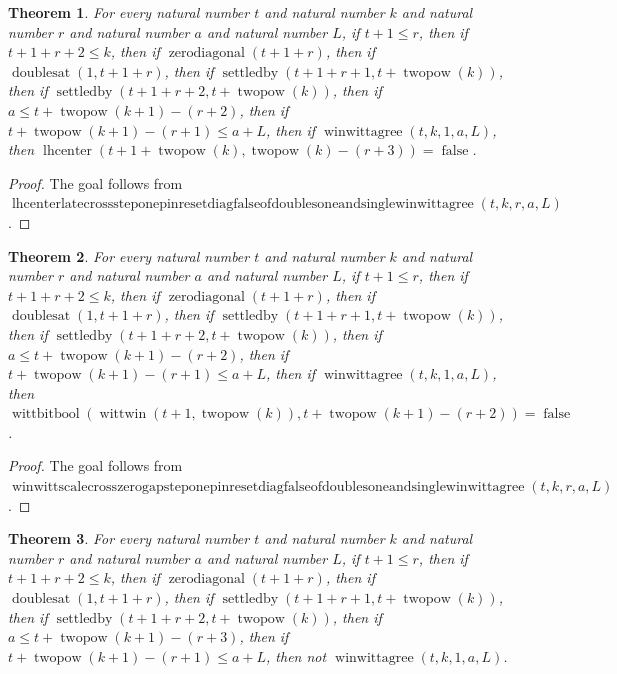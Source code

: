 \documentclass[11pt]{article}
\newtheorem{theorem}{Theorem}[section]
\theoremstyle{definition}
\begin{document}
\begin{theorem}
\label{ll:paper:lhcenter-late-cross-step-one-pin-reset-diag-false-of-doubles-one-and-single-winwittagree}
For every natural number \(t\) and natural number \(k\) and natural number \(r\) and natural number \(a\) and natural number \(L\), if \(t + 1 \le r\), then if \(t + 1 + r + 2 \le k\), then if \(\operatorname{zerodiagonal}(t + 1 + r)\), then if \(\operatorname{doublesat}(1, t + 1 + r)\), then if \(\operatorname{settledby}(t + 1 + r + 1, t + \operatorname{twopow}(k))\), then if \(\operatorname{settledby}(t + 1 + r + 2, t + \operatorname{twopow}(k))\), then if \(a \le t + \operatorname{twopow}(k + 1) - (r + 2)\), then if \(t + \operatorname{twopow}(k + 1) - (r + 1) \le a + L\), then if \(\operatorname{winwittagree}(t, k, 1, a, L)\), then \(\operatorname{lhcenter}(t + 1 + \operatorname{twopow}(k), \operatorname{twopow}(k) - (r + 3)) = \operatorname{false}\).
\end{theorem}
\begin{proof}
The goal follows from \(\operatorname{lhcenterlatecrosssteponepinresetdiagfalseofdoublesoneandsinglewinwittagree}(t, k, r, a, L)\).
\end{proof}
\begin{theorem}
\label{ll:paper:winwitt-scale-cross-zero-gap-step-one-pin-reset-diag-false-of-doubles-one-and-single-winwittagree}
For every natural number \(t\) and natural number \(k\) and natural number \(r\) and natural number \(a\) and natural number \(L\), if \(t + 1 \le r\), then if \(t + 1 + r + 2 \le k\), then if \(\operatorname{zerodiagonal}(t + 1 + r)\), then if \(\operatorname{doublesat}(1, t + 1 + r)\), then if \(\operatorname{settledby}(t + 1 + r + 1, t + \operatorname{twopow}(k))\), then if \(\operatorname{settledby}(t + 1 + r + 2, t + \operatorname{twopow}(k))\), then if \(a \le t + \operatorname{twopow}(k + 1) - (r + 2)\), then if \(t + \operatorname{twopow}(k + 1) - (r + 1) \le a + L\), then if \(\operatorname{winwittagree}(t, k, 1, a, L)\), then \(\operatorname{wittbitbool}(\operatorname{wittwin}(t + 1, \operatorname{twopow}(k)), t + \operatorname{twopow}(k + 1) - (r + 2)) = \operatorname{false}\).
\end{theorem}
\begin{proof}
The goal follows from \(\operatorname{winwittscalecrosszerogapsteponepinresetdiagfalseofdoublesoneandsinglewinwittagree}(t, k, r, a, L)\).
\end{proof}
\begin{theorem}
\label{ll:paper:not-winwittagree-one-of-doubles}
For every natural number \(t\) and natural number \(k\) and natural number \(r\) and natural number \(a\) and natural number \(L\), if \(t + 1 \le r\), then if \(t + 1 + r + 2 \le k\), then if \(\operatorname{zerodiagonal}(t + 1 + r)\), then if \(\operatorname{doublesat}(1, t + 1 + r)\), then if \(\operatorname{settledby}(t + 1 + r + 1, t + \operatorname{twopow}(k))\), then if \(\operatorname{settledby}(t + 1 + r + 2, t + \operatorname{twopow}(k))\), then if \(a \le t + \operatorname{twopow}(k + 1) - (r + 3)\), then if \(t + \operatorname{twopow}(k + 1) - (r + 1) \le a + L\), then not \(\operatorname{winwittagree}(t, k, 1, a, L)\).
\end{theorem}
\end{document}
